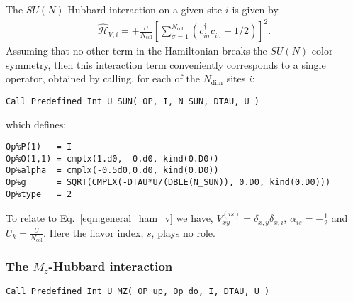 The $SU(N)$ Hubbard interaction on a given site $i$ is given by 
\begin{align}
\hat{\mathcal{H}}_{V,i} =
+ \frac{U}{N_{\mathrm{col}}}\left[
\sum\limits_{\sigma=1}^{N_{\mathrm{col}}}
\left(  c^{\dagger}_{i \sigma} c^{\phantom\dagger}_{i\sigma}  -1/2 \right) \right]^{2}.
\end{align} 
Assuming that no other term in the Hamiltonian breaks the $SU(N) $ color symmetry, then this interaction term conveniently corresponds to  a single operator, obtained by calling, for each of the $N_{\mathrm{dim}}$ sites $i$:
\begin{lstlisting}[style=fortran]
Call Predefined_Int_U_SUN( OP, I, N_SUN, DTAU, U )
\end{lstlisting}
which defines:

\begin{lstlisting}[style=fortran]
Op%P(1)   = I
Op%O(1,1) = cmplx(1.d0,  0.d0, kind(0.D0))
Op%alpha  = cmplx(-0.5d0,0.d0, kind(0.D0))
Op%g      = SQRT(CMPLX(-DTAU*U/(DBLE(N_SUN)), 0.D0, kind(0.D0))) 
Op%type   = 2

\end{lstlisting}

To relate to  Eq.~\eqref{eqn:general_ham_v} we have,   $V_{x y}^{(is)} =  \delta_{x,y} \delta_{x,i}$, $\alpha_{is} = -\frac{1}{2}$ and $U_{k} =  \frac{U}{N_{\mathrm{col}}}$.   Here  the flavor index, $s$,  plays no role. 


\subsubsection{The $M_z$-Hubbard interaction}

\begin{lstlisting}[style=fortran]
Call Predefined_Int_U_MZ( OP_up, Op_do, I, DTAU, U )
\end{lstlisting}

